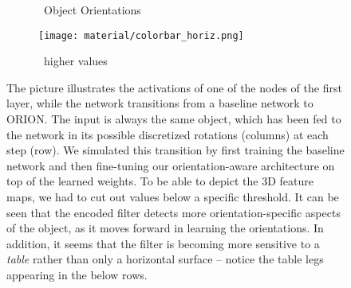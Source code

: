 \documentclass{bmvc2k}
\begin{document}
\begin{figure}[]
  \centering
  \begin{minipage}{.05\linewidth}
  \end{minipage}
  \begin{minipage}{.9\linewidth}
    \begin{subfigure}[b]{.9\linewidth} \centering
      ~Object Orientations~
    \end{subfigure}
    \begin{subfigure}[b]{.9\linewidth} \centering
    \end{subfigure}
    \begin{subfigure}[b]{.9\linewidth} \centering
      \texttt{[image: material/colorbar\_horiz.png]}
    \end{subfigure}
    \begin{subfigure}[b]{.9\linewidth} \centering
      ~higher values~
    \end{subfigure}
  \end{minipage}
  \vspace*{.5cm}
  \caption{The picture illustrates the activations of one of the nodes of the first layer, while the network transitions from a baseline network to ORION. The input is always the same object, which has been fed to the network in its possible discretized rotations (columns) at each step (row). We simulated this transition by first training the baseline network and then fine-tuning our orientation-aware architecture on top of the learned weights. To be able to depict the 3D feature maps, we had to cut out values below a specific threshold. It can be seen that the encoded filter detects more orientation-specific aspects of the object, as it moves forward in learning the orientations. In addition, it seems that the filter is becoming more sensitive to a \emph{table} rather than only a horizontal surface -- notice the table legs appearing in the below rows.}
  \label{fig:featuremaps}
\end{figure}
\end{document}
